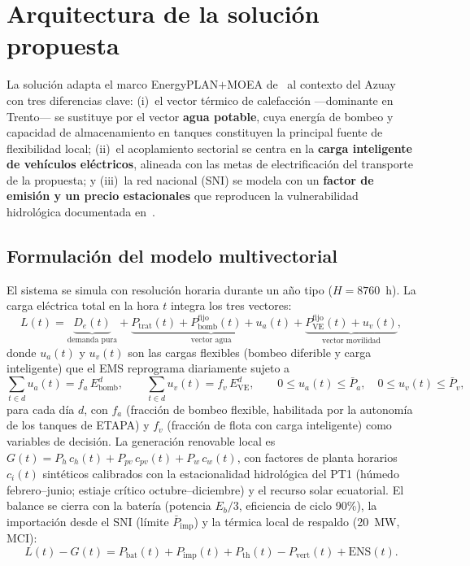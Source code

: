 \documentclass[11pt,a4paper]{article}
\begin{document}
\section{Arquitectura de la soluci\'on propuesta}
La soluci\'on adapta el marco EnergyPLAN$+$MOEA de~\cite{viesi2020} al contexto del Azuay
con tres diferencias clave: (i)~el vector t\'ermico de calefacci\'on ---dominante en
Trento--- se sustituye por el vector \textbf{agua potable}, cuya energ\'ia de bombeo y
capacidad de almacenamiento en tanques constituyen la principal fuente de flexibilidad
local; (ii)~el acoplamiento sectorial se centra en la \textbf{carga inteligente de
veh\'iculos el\'ectricos}, alineada con las metas de electrificaci\'on del transporte de
la propuesta; y (iii)~la red nacional (SNI) se modela con un \textbf{factor de emisi\'on y
un precio estacionales} que reproducen la vulnerabilidad hidrol\'ogica documentada
en~\cite{reporte2025}.

\subsection{Formulaci\'on del modelo multivectorial}
El sistema se simula con resoluci\'on horaria durante un a\~no tipo ($H=8760$~h). La carga
el\'ectrica total en la hora $t$ integra los tres vectores:
\begin{equation}
L(t) = \underbrace{D_e(t)}_{\text{demanda pura}}
     + \underbrace{P_{\mathrm{trat}}(t) + P_{\mathrm{bomb}}^{\mathrm{fijo}}(t) + u_a(t)}_{\text{vector agua}}
     + \underbrace{P_{\mathrm{VE}}^{\mathrm{fijo}}(t) + u_v(t)}_{\text{vector movilidad}},
\end{equation}
donde $u_a(t)$ y $u_v(t)$ son las cargas flexibles (bombeo diferible y carga inteligente)
que el EMS reprograma diariamente sujeto a
\begin{equation}
\sum_{t\in d} u_a(t) = f_a\,E_{\mathrm{bomb}}^{d}, \qquad
\sum_{t\in d} u_v(t) = f_v\,E_{\mathrm{VE}}^{d}, \qquad
0 \le u_a(t) \le \bar P_a,\quad 0 \le u_v(t) \le \bar P_v,
\end{equation}
para cada d\'ia $d$, con $f_a$ (fracci\'on de bombeo flexible, habilitada por la autonom\'ia
de los tanques de ETAPA) y $f_v$ (fracci\'on de flota con carga inteligente) como variables
de decisi\'on. La generaci\'on renovable local es
$G(t) = P_h\,c_h(t) + P_{pv}\,c_{pv}(t) + P_w\,c_w(t)$,
con factores de planta horarios $c_i(t)$ sint\'eticos calibrados con la estacionalidad
hidrol\'ogica del PT1 (h\'umedo febrero--junio; estiaje cr\'itico octubre--diciembre) y el
recurso solar ecuatorial. El balance se cierra con la bater\'ia (potencia $E_b/3$,
eficiencia de ciclo 90\%), la importaci\'on desde el SNI (l\'imite $\bar P_{\mathrm{imp}}$)
y la t\'ermica local de respaldo (20~MW, MCI):
\begin{equation}
L(t) - G(t) = P_{\mathrm{bat}}(t) + P_{\mathrm{imp}}(t) + P_{\mathrm{th}}(t)
            - P_{\mathrm{vert}}(t) + \mathrm{ENS}(t).
\end{equation}
\end{document}
